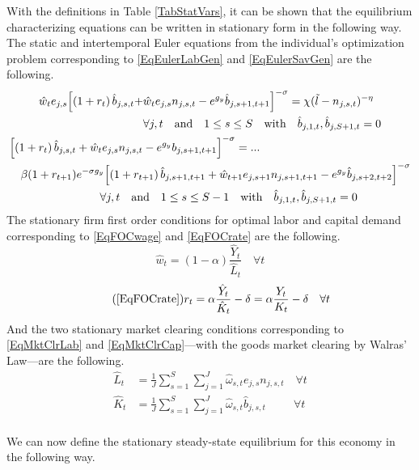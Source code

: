 \documentclass[letterpaper,12pt]{article}
\theoremstyle{definition}
\begin{document}
\begin{spacing}{1.5}
    \noindent With the definitions in Table \ref{TabStatVars}, it can be shown that the equilibrium characterizing equations can be written in stationary form in the following way. The static and intertemporal Euler equations from the individual's optimization problem corresponding to \eqref{EqEulerLabGen} and \eqref{EqEulerSavGen} are the following.
    \begin{gather}
      \begin{split}
        \hat{w}_t e_{j,s}\Bigl[\left(1+r_t\right)\hat{b}_{j,s,t} + &\hat{w}_t e_{j,s}n_{j,s,t} - e^{g_y}\hat{b}_{j,s+1,t+1}\Bigr]^{-\sigma} = \chi(\tilde{l} - n_{j,s,t})^{-\eta} \\
        &\forall j,t \quad\text{and}\quad 1\leq s\leq S \quad\text{with}\quad \hat{b}_{j,1,t},\hat{b}_{j,S+1,t}=0
      \end{split} \label{EqEulerLabStat} \\
      \begin{split}
        &\Bigl[\left(1+r_t\right)\hat{b}_{j,s,t} + \hat{w}_t e_{j,s}n_{j,s,t} - e^{g_y}b_{j,s+1,t+1}\Bigr]^{-\sigma} = ... \\
        &\quad \beta(1+r_{t+1})e^{-\sigma g_y}\Bigl[\left(1+r_{t+1}\right)\hat{b}_{j,s+1,t+1} + \hat{w}_{t+1}e_{j,s+1}n_{j,s+1,t+1} - e^{g_y}\hat{b}_{j,s+2,t+2}\Bigr]^{-\sigma} \\
        &\quad\quad\quad\quad\quad\quad\quad\quad\forall j,t \quad\text{and}\quad 1\leq s\leq S-1 \quad\text{with}\quad \hat{b}_{j,1,t},\hat{b}_{j,S+1,t}=0
      \end{split} \label{EqEulerSavStat}
    \end{gather}
    The stationary firm first order conditions for optimal labor and capital demand corresponding to \eqref{EqFOCwage} and \eqref{EqFOCrate} are the following.
    \begin{equation}\label{EqFOCwageStat}
       \hat{w}_t = (1-\alpha)\frac{\hat{Y}_t}{\hat{L}_t} \quad \forall t
    \end{equation}
    \begin{equation}\tag{\ref{EqFOCrate}}
       r_t = \alpha\frac{\hat{Y}_t}{\hat{K}_t} - \delta = \alpha\frac{Y_t}{K_t} - \delta \quad \forall t
    \end{equation}
    And the two stationary market clearing conditions corresponding to \eqref{EqMktClrLab} and \eqref{EqMktClrCap}---with the goods market clearing by Walras' Law---are the following.
    \begin{align}
      \hat{L}_t &= \frac{1}{J}\sum_{s=1}^S\sum_{j=1}^{J} \hat{\omega}_{s,t}e_{j,s}n_{j,s,t} \quad \forall t \label{EqMktClrLabStat} \\
      \hat{K}_t &= \frac{1}{J}\sum_{s=1}^{S}\sum_{j=1}^{J}\hat{\omega}_{s,t}\hat{b}_{j,s,t} \quad\quad\:\: \forall t \label{EqMktClrCapStat} \\
    \end{align}

    We can now define the stationary steady-state equilibrium for this economy in the following way.

    \vspace{7mm}
    \end{spacing}
\end{document}

